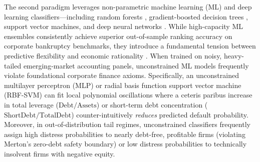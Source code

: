 \documentclass[11pt,a4paper]{article}
\begin{document}
The second paradigm leverages non-parametric machine learning (ML) and deep learning classifiers---including random forests \citep{breiman2001random}, gradient-boosted decision trees \citep{chen2016xgboost,ke2017lightgbm,prokhorenkova2018catboost}, support vector machines, and deep neural networks \citep{lessmann2015benchmarking,zieba2016ensemble,barboza2017machine,mai2019deep,hosaka2019bankruptcy,gunnarsson2021deep}. While high-capacity ML ensembles consistently achieve superior out-of-sample ranking accuracy on corporate bankruptcy benchmarks, they introduce a fundamental tension between predictive flexibility and economic rationality \citep{bussmann2021explainable,bucker2022transparency,dumitrescu2022machine}. When trained on noisy, heavy-tailed emerging-market accounting panels, unconstrained ML models frequently violate foundational corporate finance axioms. Specifically, an unconstrained multilayer perceptron (MLP) or radial basis function support vector machine (RBF-SVM) can fit local polynomial oscillations where a ceteris paribus increase in total leverage ($\text{Debt}/\text{Assets}$) or short-term debt concentration ($\text{ShortDebt}/\text{TotalDebt}$) counter-intuitively \textit{reduces} predicted default probability. Moreover, in out-of-distribution tail regimes, unconstrained classifiers frequently assign high distress probabilities to nearly debt-free, profitable firms (violating Merton's zero-debt safety boundary) or low distress probabilities to technically insolvent firms with negative equity.
\end{document}
